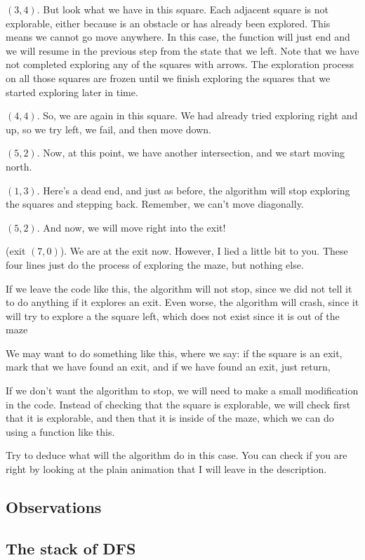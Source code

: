 \documentclass[12pt]{article}
\begin{document}
$(3, 4)$. But look what we have in this square. Each adjacent
square is not explorable, either because is an obstacle or
has already been explored. This means we cannot go move anywhere.
In this case, the function will just end and we will resume
in the previous step from the state that we left.
Note that we have not completed exploring any of the squares
with arrows. The exploration process on all those squares are
frozen until we finish exploring the squares that we started
exploring later in time.

$(4, 4)$. So, we are again in this square. We had already tried
exploring right and up, so we try left, we fail, and then move
down.

$(5, 2)$. Now, at this point, we have another intersection,
and we start moving north.

$(1, 3)$. Here's a dead end, and just as before, the algorithm
will stop exploring the squares and stepping back.
Remember, we can't move diagonally.

$(5, 2)$. And now, we will move right into the exit!

(exit $(7, 0)$). We are at the exit now. However, I lied a
little bit to you. These four lines just do the process of
exploring the maze, but nothing else.

If we leave the code like this, the algorithm will not stop,
since we did not tell it to do anything if it explores an
exit. Even worse, the algorithm will crash, since it will
try to explore a the square left, which does not 
exist since it is out of the maze

We may want to do something like this,
where we say: if the square is an exit, mark that we have found
an exit, and if we have found an exit, just return,

If we don't want the algorithm to stop, we will need
to make a small modification in the code. Instead of
checking that the square is explorable,
we will check first that it is explorable,
and then that it is inside of the maze, which we can do using
a function like this.

Try to deduce what will the algorithm do in this case. You
can check if you are right by looking at the plain animation that
I will leave in the description.

\subsection{Observations}

\subsection{The stack of DFS}
\end{document}
